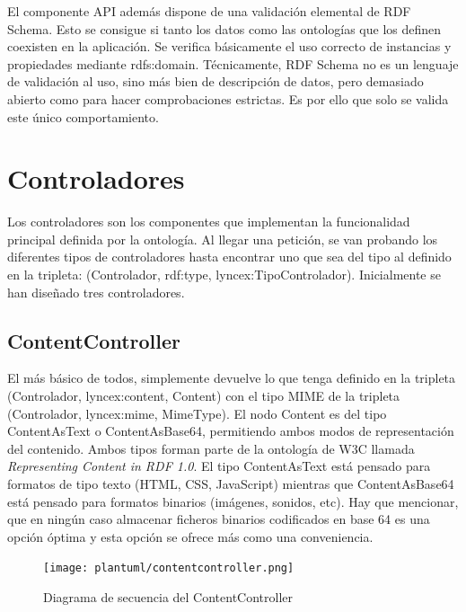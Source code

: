 \documentclass[12pt]{report} %
\begin{document}
El componente API además dispone de una validación elemental de RDF Schema.
Esto se consigue si tanto los datos como las ontologías que los definen coexisten en la aplicación.
Se verifica básicamente el uso correcto de instancias y propiedades mediante rdfs:domain.
Técnicamente, RDF Schema no es un lenguaje de validación al uso, sino más bien de descripción de datos, pero demasiado abierto como para hacer comprobaciones estrictas.
Es por ello que solo se valida este único comportamiento.


\section{Controladores}
Los controladores son los componentes que implementan la funcionalidad principal definida por la ontología.
Al llegar una petición, se van probando los diferentes tipos de controladores hasta encontrar uno que sea del tipo al definido en la tripleta: (Controlador, rdf:type, lyncex:TipoControlador).
Inicialmente se han diseñado tres controladores.

\subsection{ContentController}
El más básico de todos, simplemente devuelve lo que tenga definido en la tripleta (Controlador, lyncex:content, Content) con el tipo MIME 
de la tripleta (Controlador, lyncex:mime, MimeType). El nodo Content es del tipo ContentAsText o ContentAsBase64, permitiendo ambos modos de representación del contenido.
Ambos tipos forman parte de la ontología de W3C llamada \textit{Representing Content in RDF 1.0}\cite{cnt}.
El tipo ContentAsText está pensado para formatos de tipo texto (HTML, CSS, JavaScript) mientras que ContentAsBase64 está pensado para formatos binarios (imágenes, sonidos, etc).
Hay que mencionar, que en ningún caso almacenar ficheros binarios codificados en base 64 es una opción óptima y esta opción se ofrece más como una conveniencia.

\begin{figure}[h]
    \centering
    \texttt{[image: plantuml/contentcontroller.png]}
    \caption{Diagrama de secuencia del ContentController}
    \label{fig:contentcontroller}
\end{figure}
\end{document}
